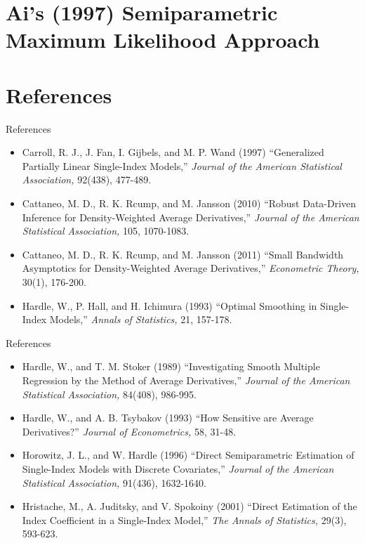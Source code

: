 \documentclass[xcolor=svgnames,dvipdfmx,cjk]{beamer}
\theoremstyle{example}
\begin{document}
\section{Ai's (1997) Semiparametric Maximum Likelihood Approach}
  
  
  
  
  
  
  
  
  
  
\section{References}
  


\begin{frame}{References}
\begin{itemize}
  \item Carroll, R. J., J. Fan, I. Gijbels, and M. P. Wand (1997)
        ``Generalized Partially Linear Single-Index Models,'' 
        \textit{Journal of the American Statistical Association,} 92(438), 477-489.
  \item Cattaneo, M. D., R. K. Rcump, and M. Jansson (2010)
        ``Robust Data-Driven Inference for Density-Weighted Average Derivatives,''
        \textit{Journal of the American Statistical Association,} 105, 1070-1083.
  \item Cattaneo, M. D., R. K. Rcump, and M. Jansson (2011)
        ``Small Bandwidth Asymptotics for Density-Weighted Average Derivatives,''
        \textit{Econometric Theory,} 30(1), 176-200.
  \item Hardle, W., P. Hall, and H. Ichimura (1993)
        ``Optimal Smoothing in Single-Index Models,'' 
        \textit{Annals of Statistics,} 21, 157-178.
\end{itemize}
\end{frame}

\begin{frame}{References}
\begin{itemize}
  \item Hardle, W., and T. M. Stoker (1989)
        ``Investigating Smooth Multiple Regression by the Method of Average Derivatives,''
        \textit{Journal of the American Statistical Association,} 84(408), 986-995.
  \item Hardle, W., and A. B. Tsybakov (1993)
        ``How Sensitive are Average Derivatives?''
        \textit{Journal of Econometrics,} 58, 31-48.
  \item Horowitz, J. L., and W. Hardle (1996)
        ``Direct Semiparametric Estimation of Single-Index Models with Discrete Covariates,''
        \textit{Journal of the American Statistical Association,} 91(436), 1632-1640.
  \item Hristache, M., A. Juditsky, and V. Spokoiny (2001)
        ``Direct Estimation of the Index Coefficient in a Single-Index Model,''
        \textit{The Annals of Statistics,} 29(3), 593-623.
\end{itemize}
\end{frame}
\end{document}
